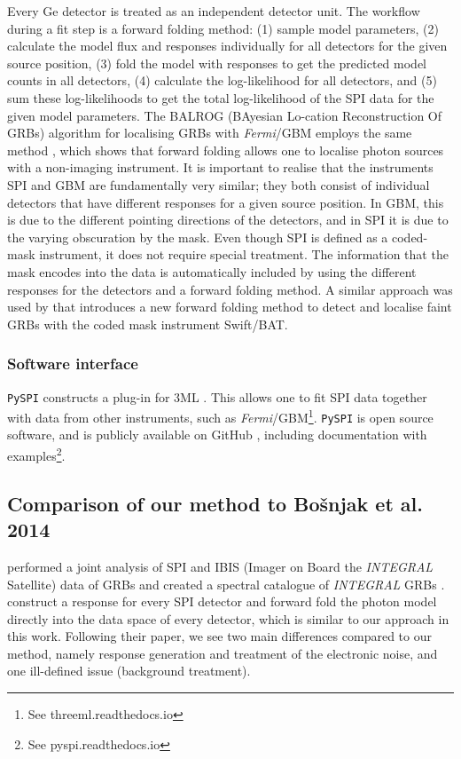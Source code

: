 \documentclass{aa}
\begin{document}
Every Ge detector is treated as an independent detector unit. The workflow during a fit step is a forward folding method:
(1) sample model parameters, (2) calculate the model flux and responses individually for all detectors for the given source position, (3) fold the model with responses to get the predicted model counts in all detectors, (4) calculate the log-likelihood for all detectors, and (5) sum these log-likelihoods to get the total log-likelihood of the SPI data for the given model parameters.
The BALROG (BAyesian Lo-cation Reconstruction Of GRBs) algorithm for localising GRBs with \textit{Fermi}/GBM employs the same method \citep{balrog}, which shows that forward folding allows one to localise photon sources with a non-imaging instrument. It is important to realise that the instruments SPI and GBM are fundamentally very similar; they both consist of individual detectors that have different responses for a given source position. In GBM, this is due to the different pointing directions of the detectors, and in SPI it is due to the varying obscuration by the mask. Even though SPI is defined as a coded-mask instrument, it does not require special treatment. The information that the mask encodes into the data is automatically included by using the different responses for the detectors and a forward folding method. A similar approach was used by \citet{Tohuvavohu-2021} that introduces a new forward folding method to detect and localise faint GRBs with the coded mask instrument Swift/BAT.

\subsubsection{Software interface}

{\tt PySPI} constructs a plug-in for 3ML \citep{3ML}. This allows one to fit SPI data together with data from other instruments, such as \textit{Fermi}/GBM\footnote{See threeml.readthedocs.io}. {\tt PySPI} is open source software, and is publicly available on GitHub \citep{joss}, including documentation with examples\footnote{See pyspi.readthedocs.io}.

\subsection{Comparison of our method to Bo{\v{s}}njak et al. 2014}

\citet{Bosnjak-2014} performed a joint analysis of SPI and IBIS (Imager on Board the \textit{INTEGRAL} Satellite) data of GRBs and created a spectral catalogue of \textit{INTEGRAL} GRBs \citep{Ubertini-2003}. \citet{Bosnjak-2014} construct a response for every SPI detector and forward fold the photon model directly into the data space of every detector, which is similar to our approach in this work. Following their paper, we see two main differences compared to our method, namely response generation and treatment of the electronic noise, and one ill-defined issue (background treatment).
\end{document}
